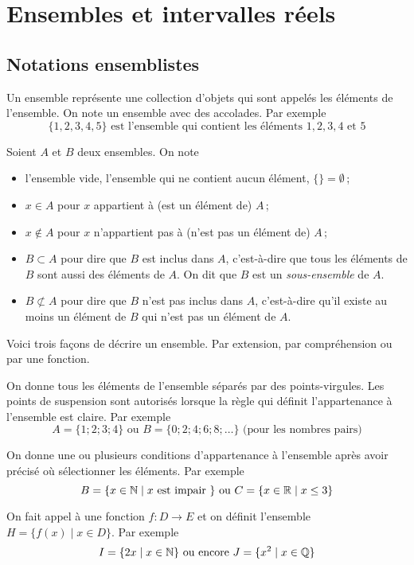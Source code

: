\documentclass[a4paper,12pt]{report}
\begin{document}
\chapter{Ensembles et intervalles réels}
\thispagestyle{fancy}
\section{Notations ensemblistes}
Un ensemble représente une collection d'objets qui sont appelés les éléments de l'ensemble. On note un ensemble avec des accolades. 
Par exemple 
\[\{1,2,3,4,5\} \text{ est l'ensemble qui contient les éléments } 1,2,3,4 \text{ et } 5\]

\begin{notation}	
Soient $A$ et $B$ deux ensembles.
On note 
\begin{itemize}
\item[{\PencilRightDown}] l'ensemble vide, l'ensemble qui ne contient aucun élément, $\{\}=\emptyset$\,; 
 \item[{\PencilRightDown}] $x\in A$ pour $x$ appartient à (est un élément de) $A$\,;
 \item[{\PencilRightDown}] $x\not\in A$ pour $x$ n'appartient pas à (n'est pas un élément de) $A$\,;
	\item[{\PencilRightDown}] $B\subset A$ pour dire que $B$ est inclus dans $A$, c'est-à-dire que tous les éléments de $B$ sont aussi des éléments de $A$. On dit que $B$ est un \emph{sous-ensemble} de $A$.
	\item[{\PencilRightDown}] $B\not \subset A$ pour dire que $B$ n'est pas inclus dans $A$, c'est-à-dire qu'il existe au moins un élément de $B$ qui n'est pas un élément de $A$.  
\end{itemize}
\end{notation}

Voici trois façons de décrire un ensemble.
Par extension, par compréhension ou par une fonction. 

\begin{description}[leftmargin=2cm]
	\item[\emph{Par extension}] On donne tous les éléments de l'ensemble séparés par des points-virgules.
		Les points de suspension sont autorisés lorsque la règle qui définit l'appartenance à l'ensemble est claire. 
		Par exemple 
		\[A=\{1;2;3;4\} \text{ ou } B=\{0;2;4;6;8;\ldots\}\text{ (pour les nombres pairs)}\]
	\item[\emph{Par compréhension}] On donne une ou plusieurs conditions d'appartenance à l'ensemble après avoir précisé où sélectionner les éléments.
		Par exemple
		\[B=\{x\in \mathbb N \mid x \text{ est impair }\} \text{ ou } C=\{x\in \mathbb R \mid x\leq 3\} \]
	\item[\emph{Par une fonction}] On fait appel à une fonction $f:D\rightarrow E$ et on définit l'ensemble $H=\{f(x) \mid x\in D\}$. 
		Par exemple
		\[I=\{2x\mid x\in \mathbb N\} \text{ ou encore } J=\{x^2\mid x\in \mathbb Q\}\]
\end{description}
\end{document}
